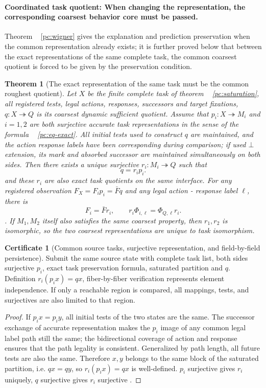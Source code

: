 \documentclass[11pt,a4paper]{article}
\theoremstyle{plain}
\newtheorem{theorem}{Theorem}[section]
\theoremstyle{definition}
\newtheorem*{certificate}{Certificate}
\theoremstyle{remark}
\begin{document}
\begin{CJK*}
\paragraph { Coordinated task quotient: When changing the representation, the corresponding coarsest behavior core must be passed. } Theorem ~ \ref{pc:wigner} gives the explanation and prediction preservation when the common representation already exists; it is further proved below that between the exact representations of the same complete task, the common coarsest quotient is forced to be given by the preservation condition.

\begin{theorem}
[The exact representation of the same task must be the common roughest quotient]\label{ar:common-quotient}
Let $X$ be the finite complete task of theorem ~ \ref{pc:saturation}, all registered tests, legal actions, responses, successors and target fixations, $q:X\twoheadrightarrow Q$ is its coarsest dynamic sufficient quotient. Assume that $p_i:X\twoheadrightarrow M_i$ and $i=1,2$ are both surjective accurate task representations in the sense of the formula ~ \eqref{pc:eq-exact}. All initial tests used to construct $q$ are maintained, and the action response labels have been corresponding during comparison; if used $\bot$ extension, its mark and absorbed successor are maintained simultaneously on both sides. Then there exists a unique surjective $r_i:M_i\twoheadrightarrow Q$ such that \[
 q=r_i p_i.
\] and these $r_i$ are also exact task quotients on the same interface. For any registered observation $F_X=F_i p_i=\bar Fq$ and any legal action - response label $\ell$, there is \[
 F_i=\bar F r_i,\qquad
 r_i\Phi_{i,\ell}=\Phi_{Q,\ell}r_i.
\]. If $M_1,M_2$ itself also satisfies the same coarsest property, then $r_1,r_2$ is isomorphic, so the two coarsest representations are unique to task isomorphism.\end{theorem}
\begin{certificate}
[Common source tasks, surjective representation, and field-by-field persistence]Submit the same source state with complete task list, both sides surjective $p_i$, exact task preservation formula, saturated partition and $q$. Definition $r_i(p_i x)=qx$, fiber-by-fiber verification represents element independence. If only a reachable region is compared, all mappings, tests, and surjectives are also limited to that region.\end{certificate}
\begin{proof}
If $p_i x=p_i y$, all initial tests of the two states are the same. The successor exchange of accurate representation makes the $p_i$ image of any common legal label path still the same; the bidirectional coverage of action and response ensures that the path legality is consistent. Generalized by path length, all future tests are also the same. Therefore $x,y$ belongs to the same block of the saturated partition, i.e. $qx=qy$, so $r_i(p_i x)=qx$ is well-defined. $p_i$ surjective gives $r_i$ uniquely, $q$ surjective gives $r_i$ surjective .


\end{proof}
\end{CJK*}
\end{document}
